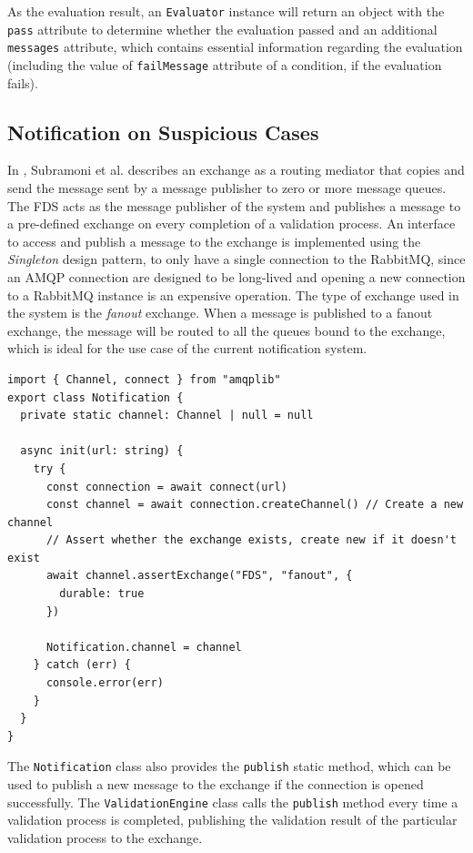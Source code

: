       As the evaluation result, an \verb;Evaluator; instance will return an object with the \verb;pass; attribute to determine whether the evaluation passed and an additional \verb;messages; attribute, which contains essential information regarding the evaluation (including the value of \verb;failMessage; attribute of a condition, if the evaluation fails). 

  \subsection{Notification on Suspicious Cases}
      
    In \autocite{amqp}, Subramoni et al. describes an exchange as a routing mediator that copies and send the message sent by a message publisher to zero or more message queues. The FDS acts as the message publisher of the system and publishes a message to a pre-defined exchange on every completion of a validation process. 
    An interface to access and publish a message to the exchange is implemented using the \emph{Singleton} \autocite[pp. 127-134]{gamma-1995} design pattern, to only have a single connection to the RabbitMQ, since an AMQP connection are designed to be long-lived and opening a new connection to a RabbitMQ instance is an expensive operation. The type of exchange used in the system is the \emph{fanout} exchange. When a message is published to a fanout exchange, the message will be routed to all the queues bound to the exchange, which is ideal for the use case of the current notification system. 

    \begin{lstlisting}[style=es6, caption={Openning a connection to RabbitMQ instance (TypeScript)}]
import { Channel, connect } from "amqplib"
export class Notification {
  private static channel: Channel | null = null

  async init(url: string) {
    try {
      const connection = await connect(url)
      const channel = await connection.createChannel() // Create a new channel
      // Assert whether the exchange exists, create new if it doesn't exist
      await channel.assertExchange("FDS", "fanout", {
        durable: true 
      }) 

      Notification.channel = channel
    } catch (err) {
      console.error(err)
    }
  }
}
    \end{lstlisting}
    
    The \verb;Notification; class also provides the \verb;publish; static method, which can be used to publish a new message to the exchange if the connection is opened successfully. The \verb;ValidationEngine; class calls the \verb;publish; method every time a validation process is completed, publishing the validation result of the particular validation process to the exchange.


